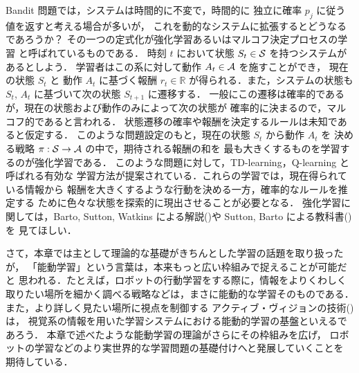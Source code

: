 \documentclass[master]{cimt}
\newcommand{\R}{{\mathbb{R}}}
\begin{document}
Bandit 問題では，システムは時間的に不変で，時間的に
独立に確率 $p_j$ に従う値を返すと考える場合が多いが，
これを動的なシステムに拡張するとどうなるであろうか？
その一つの定式化が強化学習あるいはマルコフ決定プロセスの学習
と呼ばれているものである．
時刻 $t$ において状態 $S_t \in {\cal S}$ を持つシステムがあるとしよう．
学習者はこの系に対して動作 $A_t \in {\cal A}$ を施すことができ，
現在の状態 $S_t$ と
動作 $A_t$ に基づく報酬 $r_t \in \R$ が得られる．また，システムの状態も 
$S_t$, $A_t$ に基づいて次の状態 $S_{t+1}$ に遷移する．
一般にこの遷移は確率的であるが，現在の状態および動作のみによって次の状態が
確率的に決まるので，マルコフ的であると言われる．
状態遷移の確率や報酬を決定するルールは未知であると仮定する．
このような問題設定のもと，現在の状態 $S_t$ から動作 $A_t$ を
決める戦略 $\pi : {\cal S} \to {\cal A}$ の中で，期待される報酬の和を
最も大きくするものを学習するのが強化学習である．
このような問題に対して，TD-learning，Q-learning と呼ばれる有効な
学習方法が提案されている．これらの学習では，現在得られている情報から
報酬を大きくするような行動を決める一方，確率的なルールを推定する
ために色々な状態を探索的に現出させることが必要となる．
強化学習に関しては，Barto, Sutton, Watkins 
による解説(\cite{RL})や Sutton, Barto による教科書(\cite{RLbook})を
見てほしい．

さて，本章では主として理論的な基礎がきちんとした学習の話題を取り扱ったが，
「能動学習」という言葉は，本来もっと広い枠組みで捉えることが可能だと
思われる．たとえば，ロボットの行動学習をする際に，情報をよりくわしく
取りたい場所を細かく調べる戦略などは，まさに能動的な学習そのものである．
また，より詳しく見たい場所に視点を制御する
アクティブ・ヴィジョンの技術(\cite{active_vision})は，
視覚系の情報を用いた学習システムにおける能動的学習の基盤といえるであろう．
本章で述べたような能動学習の理論がさらにその枠組みを広げ，
ロボットの学習などのより実世界的な学習問題の基礎付けへと発展していくことを
期待している．
\end{document}
